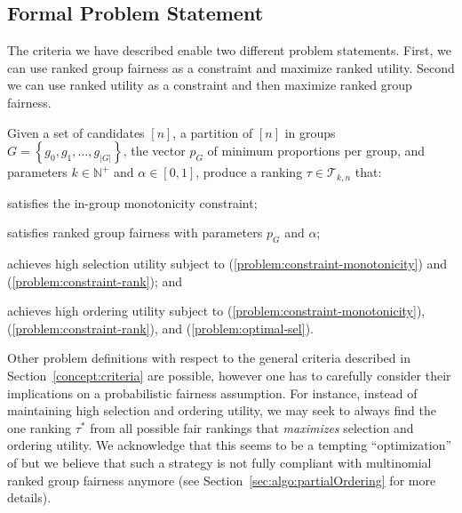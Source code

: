 \subsection{Formal Problem Statement}
\label{subsec:problem-statement}
The criteria we have described enable two different problem statements. First, we can use ranked group fairness as a constraint and maximize ranked utility. Second we can use ranked utility as a constraint and then maximize ranked group fairness.


\begin{problem}
	Given a set of candidates $[n]$, a partition of $[n]$ in groups $G = \left\{g_0, g_1, \ldots, g_{|G|}\right\}$, the vector $p_G$ of minimum proportions per group,  and parameters $k \in \mathbb{N}^+$ and $\alpha \in [0,1]$, produce a ranking $\tau \in {\mathcal T}_{k,n}$ that:
	\begin{compactenum}[(i)]
		\item \label{problem:constraint-monotonicity} satisfies the in-group monotonicity constraint;
		\item \label{problem:constraint-rank} satisfies ranked group fairness with parameters $p_G$ and $\alpha$;
		\item \label{problem:optimal-sel} achieves high selection utility subject to (\ref{problem:constraint-monotonicity}) and (\ref{problem:constraint-rank}); and
		\item \label{problem:maximum-ord} achieves high ordering utility subject to (\ref{problem:constraint-monotonicity}), (\ref{problem:constraint-rank}), and (\ref{problem:optimal-sel}).
	\end{compactenum}
\end{problem}

\label{concept:related-problems}
%
Other problem definitions with respect to the general criteria described in Section~\ref{concept:criteria} are possible, however one has to carefully consider their implications on a probabilistic fairness assumption.
%
For instance, instead of maintaining high selection and ordering utility, we may seek to always find the one ranking $\tau^*$ from all possible fair rankings that \emph{maximizes} selection and ordering utility.
%
We acknowledge that this seems to be a tempting ``optimization'' of \algoFAIR but we believe that such a strategy is not fully compliant with multinomial ranked group fairness anymore (see Section~\ref{sec:algo:partialOrdering} for more details). 
